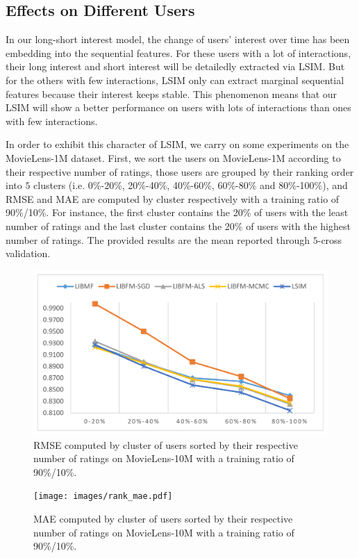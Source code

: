 \documentclass{sig-alternate-05-2015}
\begin{document}
\subsection{Effects on Different Users}
In our long-short interest model, the change of users' interest over time has been
embedding into the sequential features. For these users with a lot of interactions,
their long interest and short interest will be detailedly extracted via LSIM.
But for the others with few interactions, LSIM only can extract marginal
sequential features because their interest keeps stable.
This phenomenon means that our LSIM will show a better performance on users with
lots of interactions than ones with few interactions.

In order to exhibit this character of LSIM,
we carry on some experiments on the MovieLens-1M dataset.
First, we sort the users on MovieLens-1M according to their respective number
of ratings, those users are grouped by their ranking order into $5$  
clusters (i.e. 0\%-20\%, 20\%-40\%, 40\%-60\%, 60\%-80\% and 80\%-100\%),
and RMSE and MAE are computed by cluster respectively with a training ratio of 90\%/10\%.
For instance, the first cluster contains the 20\% of users with the least
number of ratings and the last cluster contains the 20\% of users with the
highest number of ratings.
The provided results are the mean reported through $5$-cross validation.

\begin{figure}[htbp]
    \centering
    \includegraphics[scale=0.3]{images/rank_rmse.pdf}
    \caption{RMSE computed by cluster of users sorted by their respective number
    of ratings on MovieLens-10M with a training ratio of 90\%/10\%.}
    \label{fig:rank_rsme}
\end{figure}

\begin{figure}[htbp]
    \centering
    \texttt{[image: images/rank\_mae.pdf]}
    \caption{MAE computed by cluster of users sorted by their respective number
    of ratings on MovieLens-10M with a training ratio of 90\%/10\%.}
    \label{fig:rank_mae}
\end{figure}
\end{document}
